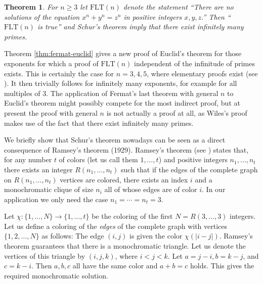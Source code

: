 \documentclass[12pt]{article}
\theoremstyle{theorem}
\newtheorem{theorem}{Theorem}
\theoremstyle{definition}
\newcommand{\FLT}{\mathrm{FLT}}
\begin{document}
\begin{theorem}{\label{thm:fermat-euclid}}
For $n \geq 3$ let $\FLT(n)$ denote the statement
``There are no solutions of the equation 
$x^n+y^n=z^n$ in positive integers $x,y,z$.''
Then ``$\FLT(n)$ is true'' and Schur's theorem imply that
there exist infinitely many primes.
\end{theorem}
Theorem \ref{thm:fermat-euclid} 
gives a new proof of Euclid's theorem for those exponents
for which a proof of $\FLT(n)$ independent of the infinitude of
primes exists.
This is certainly the case for $n=3,4,5$, 
where elementary proofs exist (see 
\cite{Edwards, Ribenboim-Fermatbook}).
It then trivially follows for
infinitely many exponents, for example for all multiples of $3$.
 The application
of Fermat's last theorem with general $n$ to Euclid's theorem
might possibly compete for the most indirect proof, 
but at present the proof with
general $n$ is not
actually a proof at all,
as Wiles's proof makes use of the fact that there exist infinitely many primes.

We briefly show that Schur's theorem nowadays can be seen as a 
direct consequence of Ramsey's theorem \cite{Ramsey} (1929).
Ramsey's theorem (see \cite[Theorem 10.3.1]{Cameron}) states that, 
for any number $t$ of colors (let us call them $1, \ldots , t$)
and positive integers $n_1, \ldots, n_t$
there exists an integer $R(n_1, \ldots, n_t)$ such that if the edges of the
complete graph on $R(n_1, \ldots, n_t)$ vertices are colored, there exists
an index $i$ and a monochromatic clique of size $n_i$ all of whose edges are of 
color $i$.
In our application we only need the case $n_1=\cdots =n_t=3$.
 

Let $\chi: \{1,\ldots, N\} \rightarrow \{1, \ldots , t\}$ be the coloring of the first 
$N=R(3, \ldots, 3)$ integers. Let us define a coloring
of the \emph{edges} of the complete graph with vertices 
$\{1, 2, \ldots, N\}$ as follows:
The edge  $(i, j)$ is given the color $\chi(|i-j|)$. Ramsey's
theorem guarantees that there is a monochromatic triangle. 
Let us denote  the vertices of this
triangle by $(i,j,k)$, where $i < j <k$.
Let $a = j - i, b = k - j$, and $c = k - i$.
Then $a,b,c$ all have the same color and $a+b=c$ holds.
This gives the required monochromatic solution.
\end{document}
